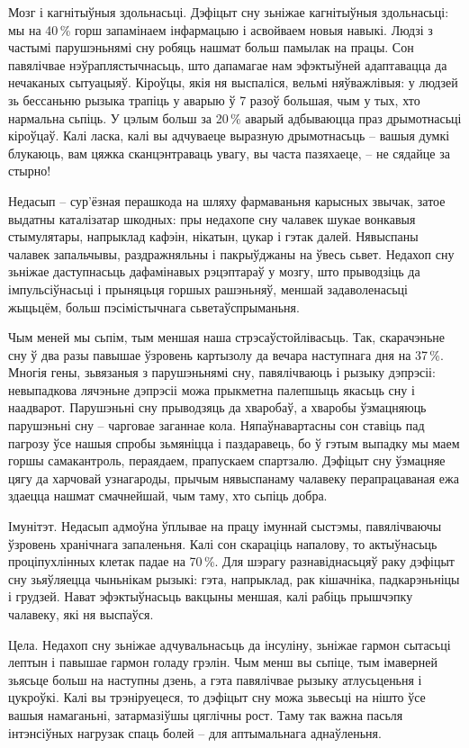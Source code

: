 Мозг і кагнітыўныя здольнасьці. Дэфіцыт сну зьніжае кагнітыўныя здольнасьці: мы на 40\,\% горш запамінаем інфармацыю і асвойваем новыя навыкі. Людзі з частымі парушэньнямі сну робяць нашмат больш памылак на працы. Сон павялічвае нэўраплястычнасьць, што дапамагае нам эфэктыўней адаптавацца да нечаканых сытуацыяў. Кіроўцы, якія ня выспаліся, вельмі няўважлівыя: у людзей зь бессаньню рызыка трапіць у аварыю ў 7 разоў большая, чым у тых, хто нармальна сьпіць. У цэлым больш за 20\,\% аварый адбываюцца праз дрымотнасьці кіроўцаў. Калі ласка, калі вы адчуваеце выразную дрымотнасьць – вашыя думкі блукаюць, вам цяжка сканцэнтраваць увагу, вы часта пазяхаеце, -- не сядайце за стырно!

Недасып – сур'ёзная перашкода на шляху фармаваньня карысных звычак, затое выдатны каталізатар шкодных: пры недахопе сну чалавек шукае вонкавыя стымулятары, напрыклад кафэін, нікатын, цукар і гэтак далей. Нявыспаны чалавек запальчывы, раздражняльны і пакрыўджаны на ўвесь сьвет. Недахоп сну зьніжае даступнасьць дафамінавых рэцэптараў у мозгу, што прыводзіць да імпульсіўнасьці і прыняцьця горшых рашэньняў, меншай задаволенасьці жыцьцём, больш пэсімістычнага сьветаўспрыманьня.

Чым меней мы сьпім, тым меншая наша стрэсаўстойлівасьць. Так, скарачэньне сну ў два разы павышае ўзровень картызолу да вечара наступнага дня на 37\,\%. Многія гены, зьвязаныя з парушэньнямі сну, павялічваюць і рызыку дэпрэсіі: невыпадкова лячэньне дэпрэсіі можа прыкметна палепшыць якасьць сну і наадварот. Парушэньні сну прыводзяць да хваробаў, а хваробы ўзмацняюць парушэньні сну – чарговае заганнае кола. Няпаўнавартасны сон ставіць пад пагрозу ўсе нашыя спробы зьмяніцца і паздаравець, бо ў гэтым выпадку мы маем горшы самакантроль, пераядаем, прапускаем спартзалю. Дэфіцыт сну ўзмацняе цягу да харчовай узнагароды, прычым нявыспанаму чалавеку перапрацаваная ежа здаецца нашмат смачнейшай, чым таму, хто сьпіць добра.

Імунітэт. Недасып адмоўна ўплывае на працу імуннай сыстэмы, павялічваючы ўзровень хранічнага запаленьня. Калі сон скараціць напалову, то актыўнасьць проціпухлінных клетак падае на 70\,\%. Для шэрагу разнавіднасьцяў раку дэфіцыт сну зьяўляецца чыньнікам рызыкі: гэта, напрыклад, рак кішачніка, падкарэньніцы і грудзей. Нават эфэктыўнасьць вакцыны меншая, калі рабіць прышчэпку чалавеку, які ня выспаўся.

Цела. Недахоп сну зьніжае адчувальнасьць да інсуліну, зьніжае гармон сытасьці лептын і павышае гармон голаду грэлін. Чым менш вы сьпіце, тым імаверней зьясьце больш на наступны дзень, а гэта павялічвае рызыку атлусьценьня і цукроўкі. Калі вы трэніруецеся, то дэфіцыт сну можа зьвесьці на нішто ўсе вашыя намаганьні, затармазіўшы цяглічны рост. Таму так важна пасьля інтэнсіўных нагрузак спаць болей – для аптымальнага аднаўленьня.

